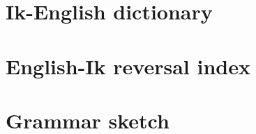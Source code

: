 \documentclass[output=book,
  nonflat,
  modfonts 
		  ]{langsci/langscibook}
\begin{document}





  

\newcommand{\headrulewidth}{0pt}
\setlength{\columnsep}{3em}
\setlength{\parindent}{0pt}

\part{Ik-English dictionary}
\renewcommand{\lsgloss}[1]{} 
 

\renewcommand{\citationform}[1]{\textbf{#1}\markboth{#1}{#1}} 
 

\renewcommand{\lsgloss}[1]{\textbf{#1}\markboth{#1}{#1}}
\renewcommand{\definition}[1]{\textbf{#1}\markboth{#1}{#1}}
\renewcommand{\citationform}[1]{{#1}}
\renewcommand{\homograph}[1]{\textsuperscript{#1}}



\part{English-Ik reversal index} 
\begin{multicols}{2}
  
\end{multicols}
% 
\part{Grammar sketch}





 
%  
\end{document}
